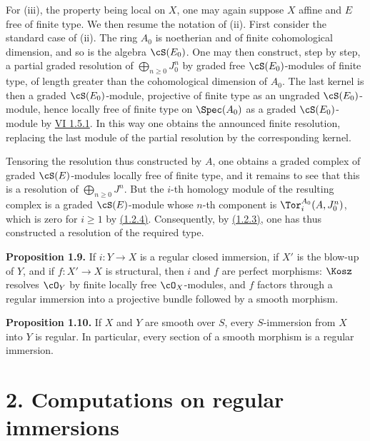 For (iii), the property being local on \(X\), one may again suppose \(X\) affine and \(E\) free of finite type. We then resume the notation of (ii). First consider the standard case of (ii). The ring \(A_0\) is noetherian and of finite cohomological dimension, and so is the algebra \(\cS(E_0)\). One may then construct, step by step, a partial graded resolution of \(\bigoplus_{n\ge0}J_0^n\) by graded free \(\cS(E_0)\)-modules of finite type, of length greater than the cohomological dimension of \(A_0\). The last kernel is then a graded \(\cS(E_0)\)-module, projective of finite type as an ungraded \(\cS(E_0)\)-module, hence locally free of finite type on \(\Spec(A_0)\) as a graded \(\cS(E_0)\)-module by \hyperlink{sga6.e06.lem.1-5-1}{VI 1.5.1}. In this way one obtains the announced finite resolution, replacing the last module of the partial resolution by the corresponding kernel.

Tensoring the resolution thus constructed by \(A\), one obtains a graded complex of graded \(\cS(E)\)-modules locally free of finite type, and it remains to see that this is a resolution of \(\bigoplus_{n\ge0}J^n\). But the \(i\)-th homology module of the resulting complex is a graded \(\cS(E)\)-module whose \(n\)-th component is \(\Tor_i^{A_0}(A,J_0^n)\), which is zero for \(i\ge1\) by \hyperlink{sga6.e07.eq.1-2-4}{(1.2.4)}. Consequently, by \hyperlink{sga6.e07.eq.1-2-3}{(1.2.3)}, one has thus constructed a resolution of the required type.

\textbf{Proposition 1.9.} If \(i:Y\to X\) is a regular closed immersion, if \(X'\) is the blow-up of \(Y\), and if \(f:X'\to X\) is structural, then \(i\) and \(f\) are perfect morphisms: \(\Kosz\) resolves \(\cO_Y\) by finite locally free \(\cO_X\)-modules, and \(f\) factors through a regular immersion into a projective bundle followed by a smooth morphism.

\textbf{Proposition 1.10.} If \(X\) and \(Y\) are smooth over \(S\), every \(S\)-immersion from \(X\) into \(Y\) is regular. In particular, every section of a smooth morphism is a regular immersion.

\section*{2. Computations on regular immersions}

